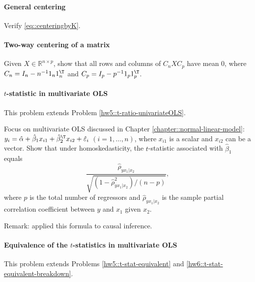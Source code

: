 \paragraph{General centering}\label{hw7::general-centering}

Verify \eqref{eq::centeringbyK}. 




\paragraph{Two-way centering of a matrix}\label{hw7::2way-centering}


Given $X \in \mathbb{R}^{n\times p}$, show that all rows and columns of $ C_n X C_p $ have mean $0$, where $C_n = I_n - n^{-1} 1_n 1_n^{\T}$ and  $C_p = I_p - p^{-1} 1_p 1_p^{\T}$. 



\paragraph{$t$-statistic in multivariate OLS}
\label{hw7::tstat-partialcorr-OLS}

This problem extends Problem \ref{hw5::t-ratio-univariateOLS}.


Focus on multivariate OLS discussed in Chapter \ref{chapter::normal-linear-model}: $y_i = \hat{\alpha}  +  \hat{\beta}_1 x_{i1} + \hat{\beta}_2^{\T} x_{i2} +  \hat{\varepsilon}_i$ $(i=1,\ldots, n)$, where $x_{i1}$ is a scalar and $x_{i2}$ can be a vector.  
Show that under homoskedasticity, the $t$-statistic associated with $ \hat{\beta}_1$ equals
$$
\frac{  \hat{\rho}_{yx_1|x_2}   }{  \sqrt{    (1  -  \hat{\rho}_{yx_1|x_2} ^2) /(n-p)  }   },
$$
where $p$ is the total number of regressors and $\hat{\rho}_{yx_1|x_2}$ is the sample partial correlation coefficient between $y$ and $x_1$ given $x_2$. 



Remark: \citet{frank2000impact} applied this formula to causal inference. 





\paragraph{Equivalence of the $t$-statistics in multivariate OLS}\label{hw7::t-stat-equivalent-multivariateOLS}


This problem extends Problems \ref{hw5::t-stat-equivalent} and \ref{hw6::t-stat-equivalent-breakdown}.  



